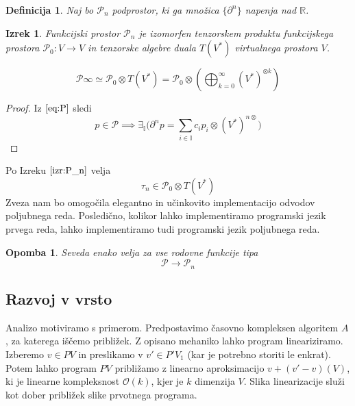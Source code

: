 \documentclass{article}
\newcommand{\II}{\mathbb{I}}
\newcommand{\dP}{\mathcal{P}}
\newcommand{\D}{\partial}
\newcommand{\sumd}{\tau}
\newtheorem{definicija}{Definicija}[section]
\newtheorem{izrek}{Izrek}[section]
\newtheorem{opomba}{Opomba}[section]
\begin{document}
\begin{definicija}
Naj bo $\dP_n$ podprostor, ki ga množica $\{\partial^n\}$ napenja nad $\mathbb{R}$.
 \end{definicija}
 
 \begin{izrek}\label{izr:P_n}
 	Funkcijski prostor $\dP_n$ je izomorfen tenzorskem produktu funkcijskega prostora $\dP_0:V\to V$ in tenzorske algebre duala $T(V^*)$ virtualnega prostora $V$.
 	
 	\begin{equation}
 	\label{eq:P_algebra}
 	 	    \dP\infty\simeq \dP_0\otimes T(V^*) = \dP_0 \otimes\left(\bigoplus_{k=0}^\infty (V^*)^{\otimes k} \right)
 	\end{equation}
 \end{izrek}
 
 \begin{proof} 
 Iz $\eqref{eq:P}$ sledi
 $$p\in\dP\implies \exists_{\II}\Big(\D^np=\sum\limits_{i\in\II} c_ip_i\otimes(V^*)^{n\otimes}\Big)$$
  \end{proof}
  
  Po Izreku $\ref{izr:P_n}$ velja
  \begin{equation}
  	\sumd_n\in\dP_0\otimes T(V^*)
  \end{equation}
   Zveza nam bo omogočila elegantno in učinkovito implementacijo odvodov poljubnega reda. Posledično, kolikor lahko implementiramo programski jezik prvega reda, lahko implementiramo tudi programski jezik poljubnega reda.
   
        \begin{opomba}
        Seveda enako velja za vse rodovne funkcije tipa
        $$\dP\to\dP_n$$
        \end{opomba}
        


 

 \subsection{Razvoj v vrsto}
  
  Analizo motiviramo s primerom. Predpostavimo časovno kompleksen algoritem $A$, za katerega iščemo približek. Z opisano mehaniko lahko program lineariziramo.
  Izberemo $v\in PV$ in preslikamo v $v'\in P'V_1$ (kar je potrebno storiti le enkrat). Potem lahko program $PV$ približamo z linearno aproksimacijo $v+(v'-v) (V)$, ki je linearne kompleksnost $\mathcal{O}(k)$, kjer je $k$ dimenzija $V$.
  Slika linearizacije služi kot dober približek slike prvotnega programa.
  
\end{document}

